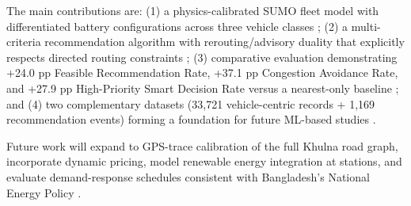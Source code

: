 \documentclass[conference]{IEEEtran}
\begin{document}
The main contributions are: (1) a physics-calibrated SUMO fleet model with differentiated battery configurations across three vehicle classes \cite{b20}; (2) a multi-criteria recommendation algorithm with rerouting/advisory duality that explicitly respects directed routing constraints \cite{b5, b6, b18}; (3) comparative evaluation demonstrating +24.0 pp Feasible Recommendation Rate, +37.1 pp Congestion Avoidance Rate, and +27.9 pp High-Priority Smart Decision Rate versus a nearest-only baseline \cite{b7, b12, b17}; and (4) two complementary datasets (33,721 vehicle-centric records + 1,169 recommendation events) forming a foundation for future ML-based studies \cite{b8}.

Future work will expand to GPS-trace calibration of the full Khulna road graph, incorporate dynamic pricing, model renewable energy integration at stations, and evaluate demand-response schedules consistent with Bangladesh's National Energy Policy \cite{b4, b16}.
\end{document}
